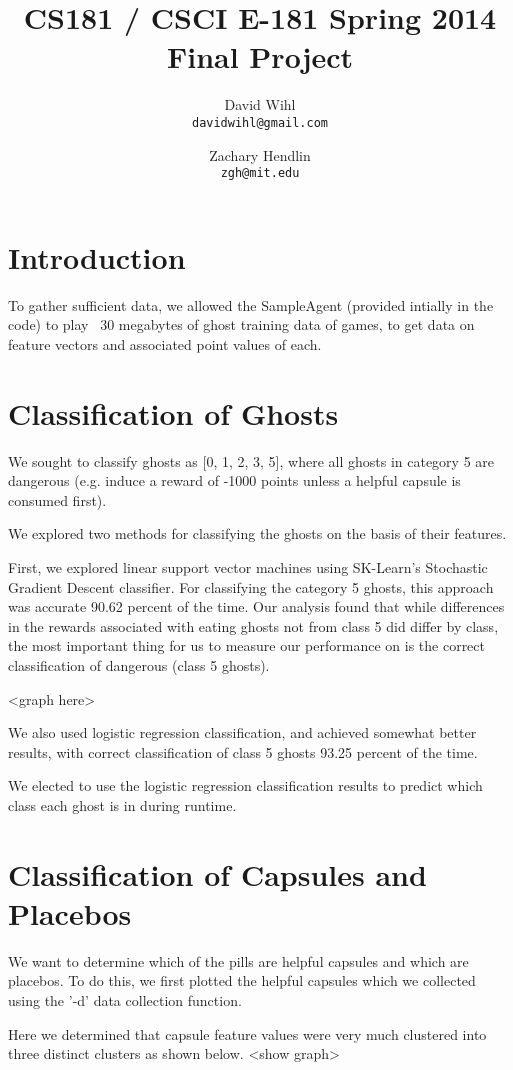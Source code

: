 \documentclass[11pt, oneside]{article}   	%
\title{CS181 / CSCI E-181 Spring 2014 Final Project}
\author{
  David Wihl\\
  \texttt{davidwihl@gmail.com}
  \and
  Zachary Hendlin\\
  \texttt{zgh@mit.edu} 
}
\begin{document}
\maketitle
\section*{Introduction}
To gather sufficient data, we allowed the SampleAgent (provided intially in the code) to play ~30 megabytes of ghost training data of games, to get data on feature vectors and associated point values of each.

\section*{Classification of Ghosts}
We sought to classify ghosts as [0, 1, 2, 3, 5], where all ghosts in category 5 are dangerous (e.g. induce a reward of -1000 points unless a helpful capsule is consumed first).

We explored two methods for classifying the ghosts on the basis of their features.

First, we explored linear support vector machines using SK-Learn's Stochastic Gradient Descent classifier.
For classifying the category 5 ghosts, this approach was accurate 90.62 percent of the time. Our analysis found that while differences in the rewards associated with eating ghosts not from class 5 did differ by class, the most important thing for us to measure our performance on is the correct classification of dangerous (class 5 ghosts).

<graph here>

We also used logistic regression classification, and achieved somewhat better results, with correct classification of class 5 ghosts 93.25 percent of the time.

We elected to use the logistic regression classification results to predict which class each ghost is in during runtime.

\section*{Classification of Capsules and Placebos}
We want to determine which of the pills are helpful capsules and which are placebos. To do this, we first plotted the helpful capsules which we collected using the '-d' data collection function.

Here we determined that capsule feature values were very much clustered into three distinct clusters as shown below.
<show graph>
\end{document}

